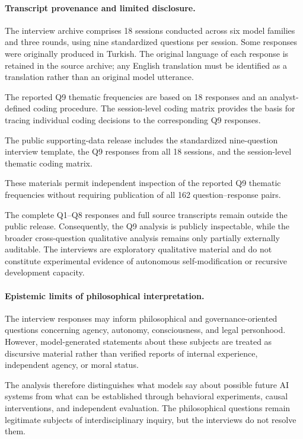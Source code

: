 \documentclass[11pt,a4paper]{article}
\begin{document}
\paragraph{Transcript provenance and limited disclosure.}

The interview archive comprises 18 sessions conducted across six model families and three rounds, using nine standardized questions per session. Some responses were originally produced in Turkish.
The original language of each response is retained in the source archive; any English translation must be identified as a translation rather than an original model utterance.

The reported Q9 thematic frequencies are based on 18 responses and an analyst-defined coding
procedure. The session-level coding matrix provides the basis for tracing individual coding decisions to the corresponding Q9 responses.

The public supporting-data release includes the standardized nine-question interview template,
the Q9 responses from all 18 sessions, and the session-level thematic coding matrix.

These materials permit independent inspection of the reported Q9 thematic frequencies without
requiring publication of all 162 question--response pairs.

The complete Q1--Q8 responses and full source transcripts remain outside the public release.
Consequently, the Q9 analysis is publicly inspectable, while the broader cross-question qualitative analysis remains only partially externally auditable. The interviews are exploratory qualitative material and do not constitute experimental evidence of autonomous self-modification or recursive development capacity.

\paragraph{Epistemic limits of philosophical interpretation.}

The interview responses may inform philosophical and governance-oriented questions concerning agency, autonomy, consciousness, and legal personhood. However, model-generated statements about these subjects are treated as discursive material rather than verified reports of internal experience, independent agency, or moral status.

The analysis therefore distinguishes what models say about possible future AI systems from what can be established through behavioral experiments, causal interventions, and independent evaluation. The philosophical questions remain legitimate subjects of interdisciplinary inquiry, but the interviews
do not resolve them.
\end{document}
